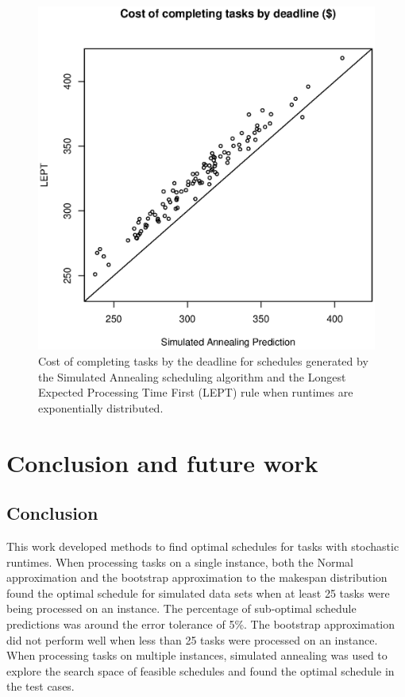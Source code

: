 \documentclass[12pt]{report}
\begin{document}
\begin{figure}
\includegraphics[width=1\textwidth]{validate-SA-LEPT-costs-2inst-100iter-10tasks.eps}
\caption{Cost of completing tasks by the deadline for schedules generated by the Simulated Annealing scheduling algorithm and the Longest Expected Processing Time First (LEPT) rule when runtimes are exponentially distributed.}
\label{fig:validate-SA-LEPT-costs-2inst-100iter-10tasks}
\end{figure}



\chapter{Conclusion and future work}

\section{Conclusion}

This work developed methods to find optimal schedules for tasks with stochastic runtimes. 
When processing tasks on a single instance, both the Normal approximation and the bootstrap approximation to the makespan distribution found the optimal schedule for simulated data sets when at least 25 tasks were being processed on an instance. 
The percentage of sub-optimal schedule predictions was around the error tolerance of 5\%. 
The bootstrap approximation did not perform well when less than 25 tasks were processed on an instance. 
When processing tasks on multiple instances, simulated annealing was used to explore the search space of feasible schedules and found the optimal schedule in the test cases.
\end{document}
